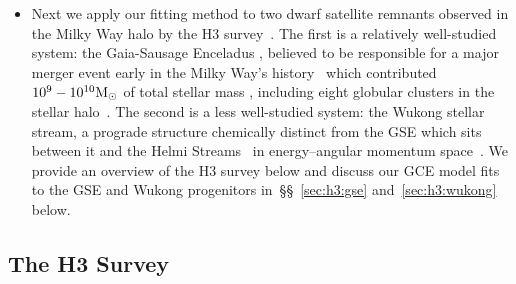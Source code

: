 \documentclass[ms.tex]{subfiles}
\begin{document}
\begin{itemize}

	\item Next we apply our fitting method to two dwarf satellite remnants
	observed in the Milky Way halo by the H3 survey~\citep[survey design:
	][]{Conroy2019}.
	The first is a relatively well-studied system: the Gaia-Sausage Enceladus
	\citep[GSE;][]{Belokurov2018, Helmi2018}, believed to be responsible for
	a major merger event early in the Milky Way's history~\citep{Chaplin2020}
	which contributed~$10^9 - 10^{10} \text{M}_\odot$ of total stellar mass
	\citep{Deason2019, Fattahi2019, Mackereth2019, Vincenzo2019}, including
	eight globular clusters in the stellar halo~\citep{Myeong2018}.
	The second is a less well-studied system: the Wukong stellar stream,
	a prograde structure chemically distinct from the GSE which sits between it
	and the Helmi Streams~\citep{Helmi1999} in energy--angular momentum
	space~\citep{Naidu2020, Naidu2022}.
	We provide an overview of the H3 survey below and discuss our GCE model
	fits to the GSE and Wukong progenitors in~\S\S~\ref{sec:h3:gse}
	and~\ref{sec:h3:wukong} below.

\end{itemize}

\subsection{The H3 Survey}
\label{sec:h3:survey}
\end{document}
